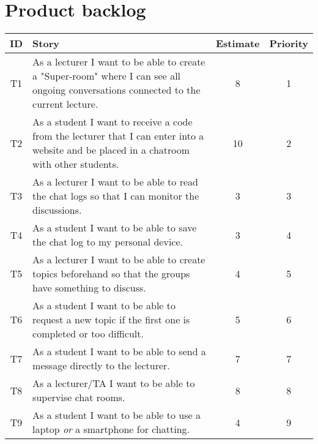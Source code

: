 \appendix

\section{Product backlog}
\label{app:Product backlog}
\begin{tabular}{ c | p{} | c | c}
     ID & Story & Estimate & Priority \\ \hline
     T1
     & As a lecturer I want to be able to create a "Super-room" where I can see all ongoing conversations connected to the current lecture.
     & 8 & 1 \\ \hline
     T2
     & As a student I want to receive a code from the lecturer that I can enter into a website and be placed in a chatroom with other students. 
     & 10 & 2 \\ \hline
     T3
     & As a lecturer I want to be able to read the chat logs so that I can monitor the discussions.
     & 3 & 3 \\ \hline
     T4
     & As a student I want to be able to save the chat log to my personal device.
     & 3 & 4 \\ \hline
     T5
     & As a lecturer I want to be able to create topics beforehand so that the groups have something to discuss.
     & 4 & 5 \\ \hline
     T6
     & As a student I want to be able to request a new topic if the first one is completed or too difficult. 
     & 5 & 6 \\ \hline
     T7
     & As a student I want to be able to send a message directly to the lecturer.
     & 7 & 7 \\ \hline
     T8
     & As a lecturer/TA I want to be able to supervise chat rooms. 
     & 8 & 8 \\ \hline
     T9
     & As a student I want to be able to use a laptop \emph{or} a smartphone for chatting. 
     & 4 & 9 \\ \hline
\end{tabular}

\newpage
